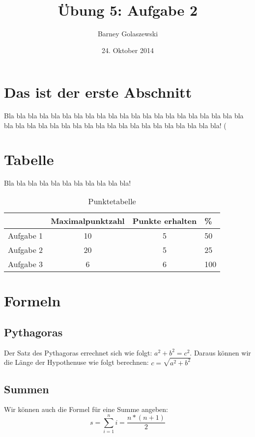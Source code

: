 \documentclass[11pt,a4paper]{article}
\title{Übung 5: Aufgabe 2}
\date{24. Oktober 2014}
\author{Barney Golaszewski}
\begin{document}
\maketitle


\section{Das ist der erste Abschnitt}
Bla bla bla bla bla bla bla bla bla bla bla bla bla bla bla bla bla bla bla bla bla bla bla bla bla bla bla bla bla bla bla bla bla bla bla bla bla bla bla bla! (\citep{meyberg2001hohere}

\section{Tabelle}
Bla bla bla bla bla bla bla bla bla bla bla!

\begin{table}[h]
\centering
\begin{tabular}{r|c|c|l}
 & Maximalpunktzahl & Punkte erhalten & \% \\
\hline
Aufgabe 1 & 10 & 5 & 50 \\
Aufgabe 2 & 20 & 5 & 25 \\
Aufgabe 3 & 6 & 6 & 100 \\
\end{tabular}
\caption{Punktetabelle}
\end{table}

\section{Formeln}

\subsection{Pythagoras}
Der Satz des Pythagoras errechnet sich wie folgt: $a^2+b^2=c^2$. Daraus können wir die Länge der Hypothenuse wie folgt berechnen: $c=\sqrt{a^2+b^2}$

\subsection{Summen}
Wir können auch die Formel für eine Summe angeben:
\begin{equation}
s=\sum\limits_{i=1}^ni=\frac{n*(n+1)}{2}
\end{equation}



\end{document}
